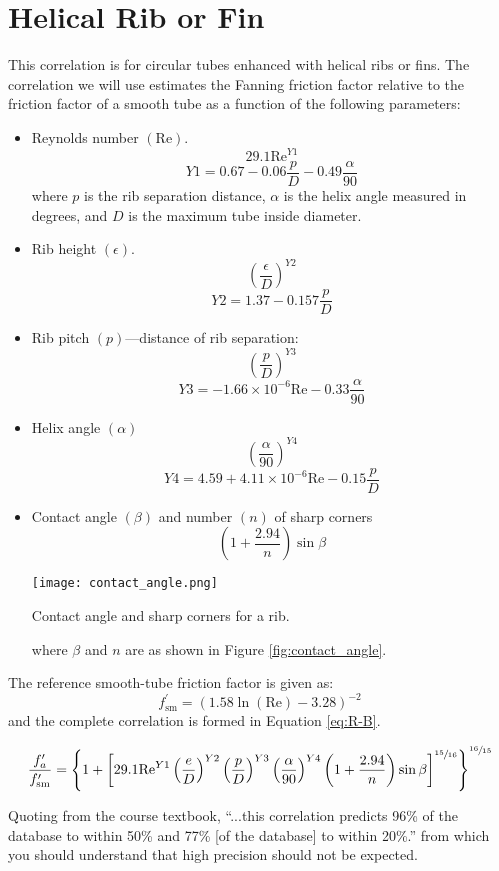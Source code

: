 \section{Helical Rib or Fin}
This correlation is for circular tubes enhanced with helical ribs or fins.  The correlation\cite{ravigururajan1999comparative} we will use estimates the Fanning friction factor relative to the friction factor of a smooth tube as a function of the following parameters:
\begin{itemize}
\item Reynolds number $(\text{Re})$.
$$29.1\text{Re}^{Y1}$$
$$Y1 = 0.67-0.06\frac{p}{D}-0.49\frac{\alpha}{90}$$ 
where $p$ is the rib separation distance, $\alpha$ is the helix angle measured in degrees, and $D$ is the maximum tube inside diameter. 
\item Rib height $(\epsilon)$.
$$\left(\frac{\epsilon}{D} \right)^{Y2}$$
$$Y2 = 1.37 - 0.157 \frac{p}{D}$$
\item Rib pitch $(p)$---distance of rib separation:
$$\left(\frac{p}{D} \right)^{Y3}$$
$$Y3 = -1.66\times10^{-6}\text{Re}-0.33\frac{\alpha}{90}$$
\item Helix angle $(\alpha)$
$$\left(\frac{\alpha}{90} \right)^{Y4}$$
$$Y4 = 4.59+4.11\times10^{-6}\text{Re}-0.15\frac{p}{D}$$
\item Contact angle $(\beta)$ and number $(n)$ of sharp corners 
$$\left(1+\frac{2.94}{n} \right)\sin{\beta}$$
\begin{marginfigure}
\texttt{[image: contact\_angle.png]}
\caption{Contact angle and sharp corners for a rib.}
\label{fig:contact_angle}
\end{marginfigure}
where $\beta$ and $n$ are as shown in Figure \ref{fig:contact_angle}.

\end{itemize}
The reference smooth-tube friction factor is given as:
$$f^{\prime}_{\text{sm}}=\left(1.58\ln{(\text{Re})}-3.28 \right)^{-2}$$
and the complete correlation is formed in Equation \ref{eq:R-B}.

\begin{equation}
\frac{f^{\prime}_a}{f^{\prime}_{\text{sm}}} = \left\{1+\left[29.1\text{Re}^{Y1}\left(\frac{e}{D} \right)^{Y2}\left(\frac{p}{D}\right)^{Y3}\left( \frac{\alpha}{90}  \right)^{Y4} \left(1+\frac{2.94}{n} \right) \sin{\beta} \right]^{\sfrac{15}{16}} \right\}^{\sfrac{16}{15}}
\label{eq:R-B}
\end{equation}

Quoting from the course textbook, ``...this correlation predicts 96\% of the database to within 50\% and 77\% [of the database] to within 20\%.'' from which you should understand that high precision should not be expected.


